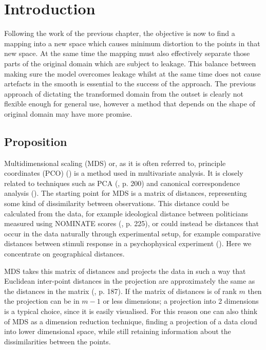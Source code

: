 
\label{chap-mds}

\section{Introduction}

Following the work of the previous chapter, the objective is now to find a mapping into a new space which causes minimum distortion to the points in that new space. At the same time the mapping must also effectively separate those parts of the original domain which are subject to leakage. This balance between making sure the model overcomes leakage whilst at the same time does not cause artefacts in the smooth is essential to the success of the approach. The previous approach of dictating the transformed domain from the outset is clearly not flexible enough for general use, however a method that depends on the shape of original domain may have more promise.

\subsection{Proposition}

Multidimensional scaling (MDS) or, as it is often referred to, principle coordinates (PCO) (\cite{gower1966}) is a method used in multivariate analysis. It is closely related to techniques such as PCA (\cite{chatfieldcollins}, p. 200) and canonical correspondence analysis (\cite{terbraak}). The starting point for MDS is a matrix of distances, representing some kind of dissimilarity between observations. This distance could be calculated from the data, for example ideological distance between politicians measured using NOMINATE scores (\cite{quantss}, p. 225), or could instead be distances that occur in the data naturally through experimental setup,  for example comparative distances between stimuli response in a psychophysical experiment (\cite{torgerson}). Here we concentrate on geographical distances.

MDS takes this matrix of distances and projects the data in such a way that Euclidean inter-point distances in the projection are approximately the same as the distances in the matrix (\cite{chatfieldcollins}, p. 187). If the matrix of distances is of rank $m$ then the projection can be in $m-1$ or less dimensions; a projection into 2 dimensions is a typical choice, since it is easily visualised. For this reason one can also think of MDS as a dimension reduction technique, finding a projection of a data cloud into lower dimensional space, while still retaining information about the dissimilarities between the points.


